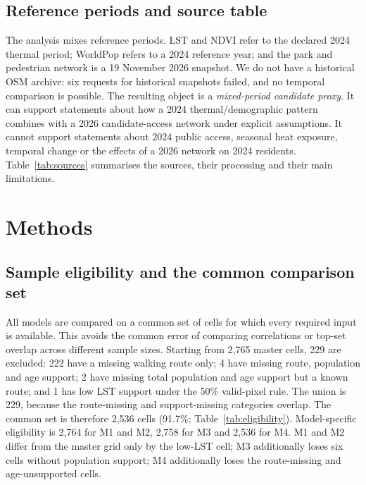 \documentclass[times,twoside]{_Templates/MultiTargetManuscript}
\begin{document}


\subsection{Reference periods and source table}

The analysis mixes reference periods. LST and NDVI refer to the declared 2024
thermal period; WorldPop refers to a 2024 reference year; and the park and
pedestrian network is a 19 November 2026 snapshot. We do not have a historical
OSM archive: six requests for historical snapshots failed, and no temporal
comparison is possible. The resulting object is a \emph{mixed-period candidate
proxy}. It can support statements about how a 2024 thermal/demographic pattern
combines with a 2026 candidate-access network under explicit assumptions. It
cannot support statements about 2024 public access, seasonal heat exposure,
temporal change or the effects of a 2026 network on 2024 residents.
Table~\ref{tab:sources} summarises the sources, their processing and their main
limitations.



\section{Methods}

\subsection{Sample eligibility and the common comparison set}

All models are compared on a common set of cells for which every required input
is available. This avoids the common error of comparing correlations or top-set
overlap across different sample sizes. Starting from 2,765 master cells, 229 are
excluded: 222 have a missing walking route only; 4 have missing route,
population and age support; 2 have missing total population and age support but a
known route; and 1 has low LST support under the 50\% valid-pixel rule. The
union is 229, because the route-missing and support-missing categories overlap.
The common set is therefore 2,536 cells (91.7\%; Table~\ref{tab:eligibility}).
Model-specific eligibility is 2,764 for M1 and M2, 2,758 for M3 and 2,536 for M4. M1 and M2 differ from the
master grid only by the low-LST cell; M3 additionally loses six cells without
population support; M4 additionally loses the route-missing and age-unsupported
cells.
\end{document}
